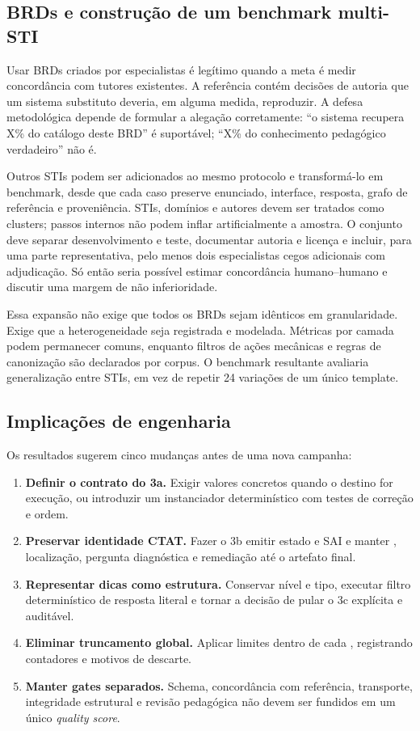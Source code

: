 \documentclass[11pt,a4paper]{article}
\begin{document}
\subsection{BRDs e construção de um benchmark multi-STI}

Usar BRDs criados por especialistas é legítimo quando a meta é medir concordância com tutores existentes. A referência contém decisões de autoria que um sistema substituto deveria, em alguma medida, reproduzir. A defesa metodológica depende de formular a alegação corretamente: ``o sistema recupera X\% do catálogo deste BRD'' é suportável; ``X\% do conhecimento pedagógico verdadeiro'' não é.

Outros STIs podem ser adicionados ao mesmo protocolo e transformá-lo em benchmark, desde que cada caso preserve enunciado, interface, resposta, grafo de referência e proveniência. STIs, domínios e autores devem ser tratados como clusters; passos internos não podem inflar artificialmente a amostra. O conjunto deve separar desenvolvimento e teste, documentar autoria e licença e incluir, para uma parte representativa, pelo menos dois especialistas cegos adicionais com adjudicação. Só então seria possível estimar concordância humano--humano e discutir uma margem de não inferioridade.

Essa expansão não exige que todos os BRDs sejam idênticos em granularidade. Exige que a heterogeneidade seja registrada e modelada. Métricas por camada podem permanecer comuns, enquanto filtros de ações mecânicas e regras de canonização são declarados por corpus. O benchmark resultante avaliaria generalização entre STIs, em vez de repetir 24 variações de um único template.

\subsection{Implicações de engenharia}

Os resultados sugerem cinco mudanças antes de uma nova campanha:

\begin{enumerate}
  \item \textbf{Definir o contrato do 3a.} Exigir valores concretos quando o destino for execução, ou introduzir um instanciador determinístico com testes de correção e ordem.
  \item \textbf{Preservar identidade CTAT.} Fazer o 3b emitir estado e SAI e manter , localização, pergunta diagnóstica e remediação até o artefato final.
  \item \textbf{Representar dicas como estrutura.} Conservar nível e tipo, executar filtro determinístico de resposta literal e tornar a decisão de pular o 3c explícita e auditável.
  \item \textbf{Eliminar truncamento global.} Aplicar limites dentro de cada , registrando contadores e motivos de descarte.
  \item \textbf{Manter gates separados.} Schema, concordância com referência, transporte, integridade estrutural e revisão pedagógica não devem ser fundidos em um único \emph{quality score}.
\end{enumerate}
\end{document}

